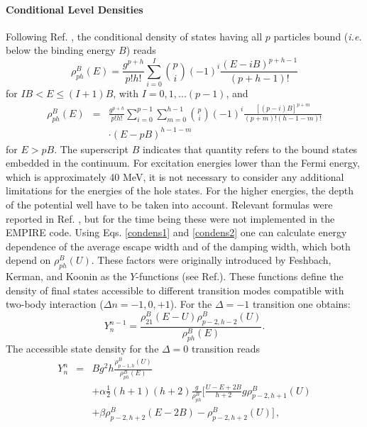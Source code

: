 \documentclass[twocolumn,amsmath,amssymb,10pt,groupedaddress,a4paper]{revtex4}
\begin{document}
\paragraph{Conditional Level Densities}
Following Ref. \cite{Stan}, the conditional density of states having
all $p$ particles bound ({\it i.e.} below the binding energy $B$) reads
\noindent \begin{equation}
\rho_{ph}^{B}(E)=\frac{g^{p+h}}{p!h!}\sum_{i=0}^{I}{{p \choose i}}(-1)^{i}\frac{(E-iB)^{p+h-1}}{(p+h-1)!}
\label{condens1}
\end{equation}
for $IB<E\leq(I+1)B$, with $I=0,1,...(p-1)$, and
\begin{eqnarray}
\rho_{ph}^{B}(E)&=&\frac{g^{p+h}}{p!h!}\sum_{i=0}^{p-1}\sum_{m=0}^{h-1}{{p \choose i}}(-1)^{i}\frac{[(p-i)B]^{p+m}}{(p+m)!(h-1-m)!}
\nonumber\\
&&\cdot(E-pB)^{h-1-m}
\label{condens2}
\end{eqnarray}
for $E>pB$. The superscript $B$ indicates that quantity refers to
the bound states embedded in the continuum. For excitation energies
lower than the Fermi energy, which is approximately 40 MeV, it is
not necessary to consider any additional limitations for the energies
of the hole states. For the higher energies, the depth of the potential
well have to be taken into account. Relevant formulas were reported
in Ref. \cite{Oblo}, but for the time being these were not implemented
in the EMPIRE code.
Using Eqs. \ref{condens1} and \ref{condens2} one can calculate energy
dependence of the average escape width and of the damping width, which
both depend on $\rho_{ph}^{B}(U)$. These factors were originally
introduced by Feshbach, Kerman, and Koonin as the $Y$-functions
(see Ref.\cite{FKK}).
These functions define the density of final
states accessible to different transition modes compatible with two-body
interaction ($\Delta n=-1,0,+1$). For the $\Delta=-1$ transition
one obtains:
\begin{equation}
Y_{n}^{n-1}=\frac{\rho_{21}^{B}(E-U)\rho_{p-2,h-2}^{B}(U)}{\rho_{ph}^{B}(E)}.
\label{Yminus}
\end{equation}
The accessible state density for the $\Delta=0$ transition reads
\begin{eqnarray}
Y_{n}^{n}  &= & Bg^{2}h\frac{\rho_{p-1,h}^{B}(U)}{\rho_{ph}^{B}(E)}\nonumber \\
 &  & +\alpha\frac{1}{2}(h+1)(h+2)\frac{g}{\rho_{ph}^{B}}\biggl[\frac{U-E+2B}{h+2}g\rho_{p-2,h+1}^{B}(U)\label{Yzero}\nonumber\\
 &  & +\beta\rho_{p-2,h+2}^{B}(E-2B)-\rho_{p-2,h+2}^{B}(U)\biggr]\,,
\end{eqnarray}
\end{document}
